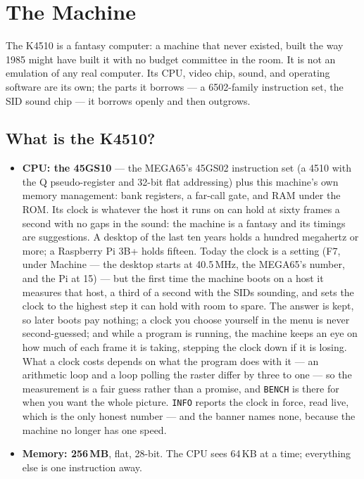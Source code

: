 \chapter{The Machine}\label{cha:machine}

The K4510 is a fantasy computer: a machine that never existed, built the
way 1985 might have built it with no budget committee in the room. It is not
an emulation of any real computer. Its CPU, video chip, sound, and operating
software are its own; the parts it borrows --- a 6502-family instruction set,
the SID sound chip --- it borrows openly and then outgrows.

\section{What is the K4510?}
\begin{itemize}[leftmargin=1.4em]
\item \textbf{CPU: the 45GS10} --- the MEGA65's 45GS02 instruction set (a
  4510 with the Q pseudo-register and 32-bit flat addressing) plus this
  machine's own memory management: bank registers, a far-call gate, and RAM
  under the ROM. Its clock is whatever the host it runs on can hold at
  sixty frames a second with no gaps in the sound: the machine is a
  fantasy and its timings are suggestions. A desktop of the last ten years holds a hundred megahertz or
  more; a Raspberry Pi 3B+ holds fifteen. Today the clock is a setting
  (F7, under Machine --- the desktop starts at 40.5\,MHz, the MEGA65's
  number, and the Pi at 15) --- but the first time the machine boots on
  a host it measures that host, a third of a second with the SIDs
  sounding, and sets the clock to the highest step it can hold with
  room to spare. The answer is kept, so later boots pay nothing; a
  clock you choose yourself in the menu is never second-guessed; and
  while a program is running, the machine keeps an eye on how much of
  each frame it is taking, stepping the clock down if it is losing.
  What a clock costs depends on what the program does with it --- an
  arithmetic loop and a loop polling the raster differ by three to one
  --- so the measurement is a fair guess rather than a promise, and
  \verb|BENCH| is there for when you want the whole picture. \verb|INFO| reports the clock in force, read live, which is the only
  honest number --- and the banner names none, because the machine no
  longer has one speed.
\item \textbf{Memory: 256\,MB}, flat, 28-bit. The CPU sees 64\,KB at a time;
  everything else is one instruction away.

\end{itemize}
